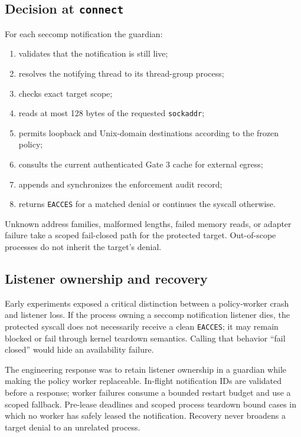 \documentclass[11pt,a4paper]{article}
\begin{document}
\subsection{Decision at \texttt{connect}}

For each seccomp notification the guardian:

\begin{enumerate}[leftmargin=*]
  \item validates that the notification is still live;
  \item resolves the notifying thread to its thread-group process;
  \item checks exact target scope;
  \item reads at most 128 bytes of the requested \texttt{sockaddr};
  \item permits loopback and Unix-domain destinations according to the frozen
        policy;
  \item consults the current authenticated Gate 3 cache for external egress;
  \item appends and synchronizes the enforcement audit record;
  \item returns \texttt{EACCES} for a matched denial or continues the syscall
        otherwise.
\end{enumerate}

Unknown address families, malformed lengths, failed memory reads, or adapter
failure take a scoped fail-closed path for the protected target. Out-of-scope
processes do not inherit the target's denial.

\subsection{Listener ownership and recovery}

Early experiments exposed a critical distinction between a policy-worker crash
and listener loss. If the process owning a seccomp notification listener dies,
the protected syscall does not necessarily receive a clean \texttt{EACCES}; it
may remain blocked or fail through kernel teardown semantics. Calling that
behavior ``fail closed'' would hide an availability failure.

The engineering response was to retain listener ownership in a guardian while
making the policy worker replaceable. In-flight notification IDs are validated
before a response; worker failures consume a bounded restart budget and use a
scoped fallback. Pre-lease deadlines and scoped process teardown bound cases in
which no worker has safely leased the notification. Recovery never broadens a
target denial to an unrelated process.
\end{document}
